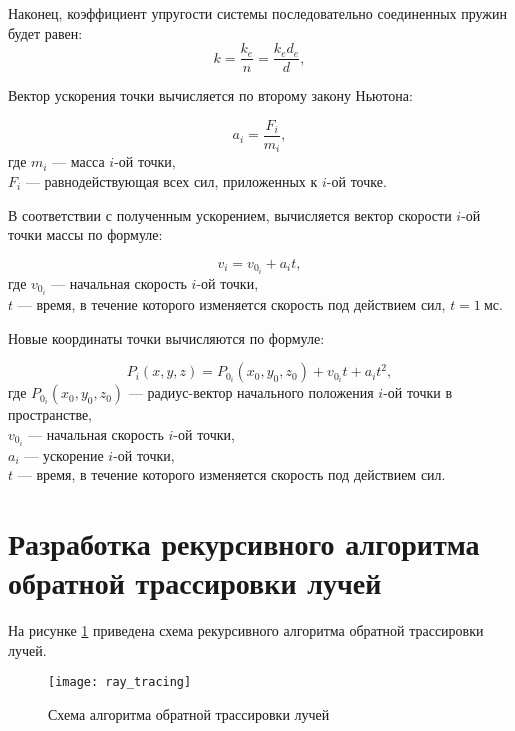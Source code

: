Наконец, коэффициент упругости системы последовательно соединенных пружин будет равен:
\begin{equation}\label{stif}
	k = \frac{k_e}{n} = \frac{k_e d_e}{d},
\end{equation}

Вектор ускорения точки вычисляется по второму закону Ньютона:

\begin{equation}\label{sln}
	a_i = \frac{F_i}{m_i},
\end{equation}
где $m_i$ --- масса $i$-ой точки,\\
\text{~~~~~~}$F_i$ --- равнодействующая всех сил, приложенных к $i$-ой точке.

В соответствии с полученным ускорением, вычисляется вектор скорости $i$-ой точки массы по формуле:

\begin{equation}\label{velocity}
	v_i = v_{0_i} + a_i t,
\end{equation}
где $v_{0_i}$ --- начальная скорость $i$-ой точки,\\
\text{~~~~~~}$t$ --- время, в течение которого изменяется скорость под действием сил, $t = 1~\text{мс}$.

Новые координаты точки вычисляются по формуле:

\begin{equation}\label{new_pos}
	P_i(x, y, z) = P_{0_i}(x_0, y_0, z_0) + v_{0_i} t + a_i t^2,
\end{equation}
где $P_{0_i}(x_0, y_0, z_0)$ --- радиус-вектор начального положения $i$-ой точки в пространстве,\\
\text{~~~~~~}$v_{0_i}$ --- начальная скорость $i$-ой точки,\\
\text{~~~~~~}$a_i$ --- ускорение $i$-ой точки,\\
\text{~~~~~~}$t$ --- время, в течение которого изменяется скорость под действием сил.

\section[Разработка рекурсивного алгоритма обратной трассировки лучей]{Разработка рекурсивного алгоритма\\обратной трассировки лучей}

На рисунке \ref{ray_tracing} приведена схема рекурсивного алгоритма обратной трассировки лучей.

\begin{figure}[p]
	\centering
	\texttt{[image: ray\_tracing]}
	\caption{Схема алгоритма обратной трассировки лучей}
	\label{ray_tracing}
\end{figure}

